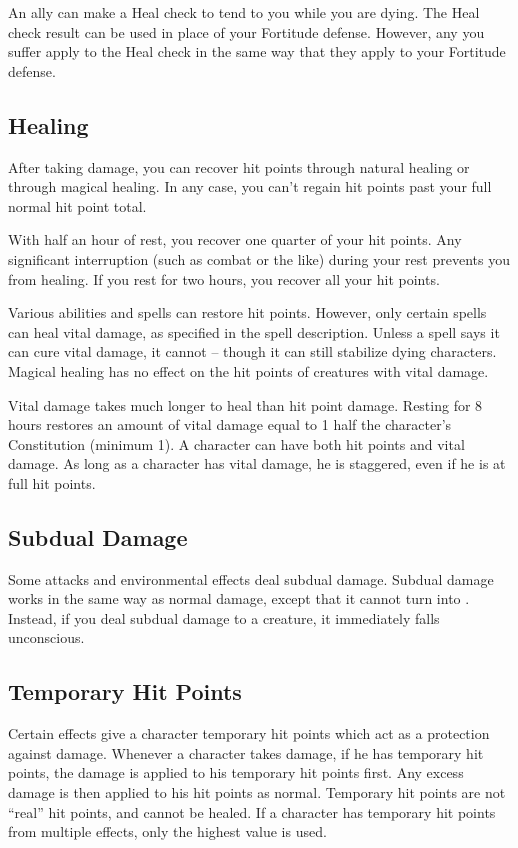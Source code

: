         An ally can make a Heal check to tend to you while you are dying.
        The Heal check result can be used in place of your Fortitude defense.
        However, any  you suffer apply to the Heal check in the same way that they apply to your Fortitude defense.

    \subsection{Healing}
        After taking damage, you can recover hit points through natural healing or through magical healing.
        In any case, you can't regain hit points past your full normal hit point total.

         With half an hour of rest, you recover one quarter of your hit points.
        Any significant interruption (such as combat or the like) during your rest prevents you from healing.
        If you rest for two hours, you recover all your hit points.

         Various abilities and spells can restore hit points.
        However, only certain spells can heal vital damage, as specified in the spell description.
        Unless a spell says it can cure vital damage, it cannot -- though it can still stabilize dying characters.
        Magical healing has no effect on the hit points of creatures with vital damage.

         Vital damage takes much longer to heal than hit point damage.
        Resting for 8 hours restores an amount of vital damage equal to 1 \add half the character's Constitution (minimum 1).
        A character can have both hit points and vital damage.
        As long as a character has vital damage, he is staggered, even if he is at full hit points.

    \subsection{Subdual Damage}\label{Subdual Damage}
        Some attacks and environmental effects deal subdual damage.
        Subdual damage works in the same way as normal damage, except that it cannot turn into .
        Instead, if you deal subdual damage to a  creature, it immediately falls unconscious.

    \subsection{Temporary Hit Points}\label{Temporary Hit Points}
        Certain effects give a character temporary hit points which act as a protection against damage.
        Whenever a character takes damage, if he has temporary hit points, the damage is applied to his temporary hit points first.
        Any excess damage is then applied to his hit points as normal.
        Temporary hit points are not ``real'' hit points, and cannot be healed.
        If a character has temporary hit points from multiple effects, only the highest value is used.

